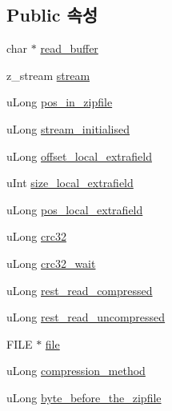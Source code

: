 \subsection*{Public 속성}
\begin{DoxyCompactItemize}
\item 
char $\ast$ \mbox{\hyperlink{structfile__in__zip__read__info__s_a6310a19e33ac2cf3280aa74199cbd89b}{read\+\_\+buffer}}
\item 
z\+\_\+stream \mbox{\hyperlink{structfile__in__zip__read__info__s_a6973c6240c02a1c8e014d6078bb2bbfc}{stream}}
\item 
u\+Long \mbox{\hyperlink{structfile__in__zip__read__info__s_a01d6195d7977bec4db506cdbee9b8a13}{pos\+\_\+in\+\_\+zipfile}}
\item 
u\+Long \mbox{\hyperlink{structfile__in__zip__read__info__s_a8f2d03c24a7b1058288606687eb6d448}{stream\+\_\+initialised}}
\item 
u\+Long \mbox{\hyperlink{structfile__in__zip__read__info__s_a8e3a240c367e7d6d199859b1b311128c}{offset\+\_\+local\+\_\+extrafield}}
\item 
u\+Int \mbox{\hyperlink{structfile__in__zip__read__info__s_a9abdc9b3f3d500d894a635cc9e956180}{size\+\_\+local\+\_\+extrafield}}
\item 
u\+Long \mbox{\hyperlink{structfile__in__zip__read__info__s_aa07cf3d7d5d68e9537ffe99499d7db6f}{pos\+\_\+local\+\_\+extrafield}}
\item 
u\+Long \mbox{\hyperlink{structfile__in__zip__read__info__s_a9d7e4dc6f312fb59bf8e60fb952f4d68}{crc32}}
\item 
u\+Long \mbox{\hyperlink{structfile__in__zip__read__info__s_a6120c521be40e8ba530249f0c766ab9d}{crc32\+\_\+wait}}
\item 
u\+Long \mbox{\hyperlink{structfile__in__zip__read__info__s_a4c7b8e6502f7195feefd676dff0bb494}{rest\+\_\+read\+\_\+compressed}}
\item 
u\+Long \mbox{\hyperlink{structfile__in__zip__read__info__s_a8e3801645cfa5bfd147fd8d037fcf9a5}{rest\+\_\+read\+\_\+uncompressed}}
\item 
F\+I\+LE $\ast$ \mbox{\hyperlink{structfile__in__zip__read__info__s_ac1b9fbf81aac280e5e9f6eaca864161b}{file}}
\item 
u\+Long \mbox{\hyperlink{structfile__in__zip__read__info__s_a86cbaa96568192cae9ab9cd606963fdb}{compression\+\_\+method}}
\item 
u\+Long \mbox{\hyperlink{structfile__in__zip__read__info__s_a52c8e657a1238a3b9fa87b4167d9b7a3}{byte\+\_\+before\+\_\+the\+\_\+zipfile}}
\end{DoxyCompactItemize}


